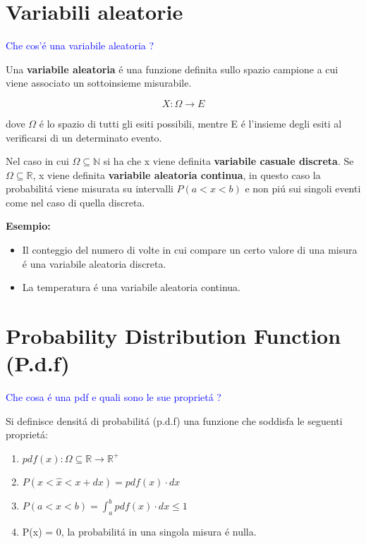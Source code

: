 \section{Variabili aleatorie}

\textcolor{blue}{Che cos'\'{e} una variabile aleatoria ?}\newline

Una \textbf{variabile aleatoria} \'{e} una funzione  definita sullo spazio campione a cui viene associato un sottoinsieme misurabile.

\begin{equation}
	X :  \Omega \rightarrow E
\end{equation}
 
 \noindent dove $\Omega$ \'{e} lo spazio di tutti gli esiti possibili, mentre E \'{e} l'insieme degli esiti al verificarsi di un determinato evento.\newline
 
 Nel caso in cui $\Omega \subseteq \mathbb{N}$ si ha che x viene definita \textbf{variabile casuale discreta}. \newline
 Se $\Omega \subseteq \mathbb{R}$, x viene definita \textbf{variabile aleatoria continua}, in questo caso la probabilit\'{a} viene misurata su intervalli $P(a<x<b)$ e non pi\'{u} sui singoli eventi come nel caso di quella discreta. \newline
 
 \noindent \textbf{Esempio:} 
 \begin{itemize}
 	\item Il conteggio del numero di volte in cui compare un certo valore di una misura \'{e} una variabile aleatoria discreta.
 	\item La temperatura \'{e} una variabile aleatoria continua. 
 \end{itemize}
 
 \section{Probability Distribution Function (P.d.f)}
 
 \textcolor{blue}{Che cosa \'{e} una pdf e quali sono le sue propriet\'{a} ?} \newline
 
 Si definisce densit\'{a} di probabilit\'{a} (p.d.f) una funzione che soddisfa le seguenti propriet\'{a}:
 
 \begin{enumerate}
 
 	\item $pdf(x): \Omega \subseteq \mathbb{R} \rightarrow \mathbb{R^+}$
 	\item $P(x < \hat{x} < x +dx) = pdf(x) \cdot dx$
 	\item $P(a < x < b) = \int_{a}^{b}{pdf(x) \cdot dx} \leq 1$
 	\item P(x) = 0, la probabilit\'{a} in una singola misura \'{e} nulla.
 		
 \end{enumerate}
 

